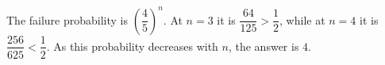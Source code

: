The failure probability is $(\dfrac{4}{5})^n$. At $n=3$ it is $\dfrac{64}{125}>\dfrac{1}{2}$, while at $n=4$ it is $\dfrac{256}{625}<\dfrac{1}{2}$. As this probability decreases with $n$, the answer is $\boxed4$.
